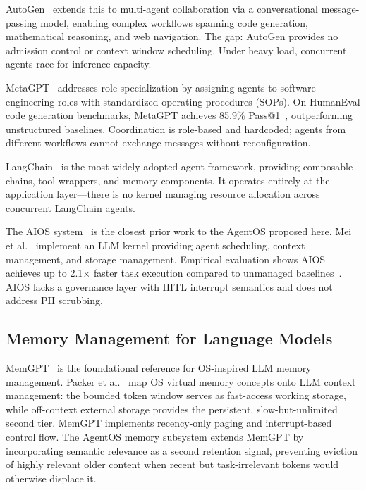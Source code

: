 \documentclass[journal]{IEEEtran}
\begin{document}
AutoGen~\cite{wu2023autogen} extends this to multi-agent collaboration via a conversational message-passing model, enabling complex workflows spanning code generation, mathematical reasoning, and web navigation. The gap: AutoGen provides no admission control or context window scheduling. Under heavy load, concurrent agents race for inference capacity.

MetaGPT~\cite{hong2023metagpt} addresses role specialization by assigning agents to software engineering roles with standardized operating procedures (SOPs). On HumanEval code generation benchmarks, MetaGPT achieves 85.9\% Pass@1~\cite{hong2023metagpt}, outperforming unstructured baselines. Coordination is role-based and hardcoded; agents from different workflows cannot exchange messages without reconfiguration.

LangChain~\cite{chase2022langchain} is the most widely adopted agent framework, providing composable chains, tool wrappers, and memory components. It operates entirely at the application layer---there is no kernel managing resource allocation across concurrent LangChain agents.

The AIOS system~\cite{mei2024aios} is the closest prior work to the AgentOS proposed here. Mei et al.~\cite{mei2024aios} implement an LLM kernel providing agent scheduling, context management, and storage management. Empirical evaluation shows AIOS achieves up to 2.1$\times$ faster task execution compared to unmanaged baselines~\cite{mei2024aios}. AIOS lacks a governance layer with HITL interrupt semantics and does not address PII scrubbing.

\subsection{Memory Management for Language Models}

MemGPT~\cite{packer2023memgpt} is the foundational reference for OS-inspired LLM memory management. Packer et al.~\cite{packer2023memgpt} map OS virtual memory concepts onto LLM context management: the bounded token window serves as fast-access working storage, while off-context external storage provides the persistent, slow-but-unlimited second tier. MemGPT implements recency-only paging and interrupt-based control flow. The AgentOS memory subsystem extends MemGPT by incorporating semantic relevance as a second retention signal, preventing eviction of highly relevant older content when recent but task-irrelevant tokens would otherwise displace it.
\end{document}
